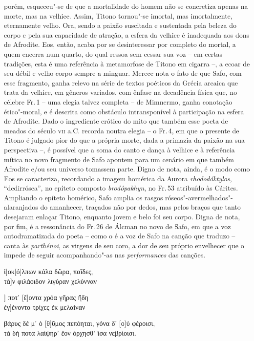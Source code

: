 {{porém, esqueceu"-se de que a mortalidade do homem não se concretiza apenas na
morte, mas na velhice. Assim, Titono tornou"-se imortal, mas imortalmente,
eternamente velho. Ora, sendo a paixão suscitada e sustentada pela
beleza do corpo e pela sua capacidade de atração, a esfera da velhice é
inadequada aos dons de Afrodite. Eos, então, acaba por se desinteressar por
completo do mortal, a quem encerra num quarto, do qual ressoa sem cessar sua
voz -- em certas tradições, esta é uma referência à metamorfose de Titono em
cigarra --, a ecoar de seu débil e velho corpo sempre a minguar. Merece nota o fato de
que Safo, com esse fragmento, ganha relevo na série de textos poéticos da
Grécia arcaica que trata da velhice, em gêneros variados, com ênfase na
decadência física que, no célebre Fr.\,1 -- uma elegia talvez completa -- de
Mimnermo, ganha conotação ético"-moral, e é descrita como obstáculo
intransponível à participação na esfera de Afrodite.
Dado o ingrediente erótico do mito que também esse poeta de meados do século
\textsc{vii} a.C. recorda noutra elegia -- o Fr.\,4, em que o presente de Titono é
julgado pior do que a própria morte, dada a primazia da paixão na sua perspectiva
--, é possível que a soma do canto e dança à
velhice e à referência mítica no novo fragmento de Safo apontem para um cenário
em que também Afrodite e/ou seu universo tomassem parte. Digno de nota, ainda,
é o modo como Eos se caracteriza, recordando a imagem homérica da Aurora
\textit{rhododáktylos}, ``dedirrósea'', no
epíteto composto \textit{brodópakhyn}, no Fr.\,53 atribuído às Cárites.
Ampliando o epíteto homérico, Safo amplia os rasgos
róseos"-avermelhados"-alaranjados do amanhecer, traçados não por dedos, mas pelos
braços que tanto desejaram enlaçar Titono, enquanto jovem e belo foi seu
corpo. Digna de nota, por fim, é a ressonância do Fr.\,26 de Álcman no novo de Safo, em que a voz autodramatizada do poeta -- como o é a voz de Safo na canção que traduzo -- canta às \textit{parthénoi}, as virgens de seu coro, a dor de seu próprio envelhecer que o impede de seguir acompanhando"-as nas \textit{performances} das canções.}

\begin{gkverse}
ἰ]οκ[ό]λπων κάλα δῶρα, παῖδες,\\
        τὰ]ν φιλάοιδον λιγύραν χελύνναν

] ποτ’ [ἔ]οντα χρόα γῆρας ἤδη\\
         ἐγ]ένοντο τρίχες ἐκ μελαίναν

βάρυς δέ μ’ ὀ [θ]ῦμος πεπόηται, γόνα δ’ [ο]ὐ φέροισι,\\
τὰ δή ποτα λαίψηρ’ ἔον ὄρχησθ’ ἴσα νεβρίοισι.


\end{gkverse}}
